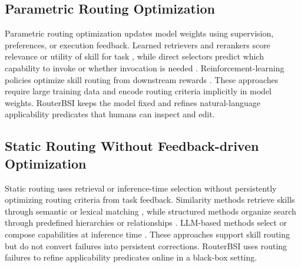 \subsection{Parametric Routing Optimization}
Parametric routing optimization updates model weights using supervision, preferences, or execution feedback. Learned retrievers and rerankers score relevance or utility of skill for task \citep{qin2024toolllm,zheng2026skillrouter,wang2026skillisnotdocument,li2026skillsinjector,zhou2026mementoskills}, while direct selectors predict which capability to invoke or whether invocation is needed \citep{ICLR2025_b646bdeb,qian-etal-2025-smart,chen2026skillskiplearningselective}. Reinforcement-learning policies optimize skill routing from downstream rewards \citep{wang2026sage,xia2026skillrl,zhang2026memskill,huang-etal-2026-toolomni,wu2026maestro}. These approaches require large training data and encode routing criteria implicitly in model weights. RouterBSI keeps the model fixed and refines natural-language applicability predicates that humans can inspect and edit.

\subsection{Static Routing Without Feedback-driven Optimization}
Static routing uses retrieval or inference-time selection without persistently optimizing routing criteria from task feedback. Similarity methods retrieve skills through semantic or lexical matching \citep{wang2024voyager,xiao2026skillsightcalibratinggenericcontent,su2026skillretrieval}, while structured methods organize search through predefined hierarchies or relationships \citep{li2026agentskillos,sun2026corpus2skill,wang2026graphskill,packer2023memgpt,liang2026skillnetcreateevaluateconnect,liu2025toolplanner}. LLM-based methods select or compose capabilities at inference time \citep{chen2026cuaskill,xia2026grasp,NEURIPS2023_77c33e6a,NEURIPS2024_e41efb03}. These approaches support skill routing but do not convert failures into persistent corrections. RouterBSI uses routing failures to refine applicability predicates online in a black-box setting.
